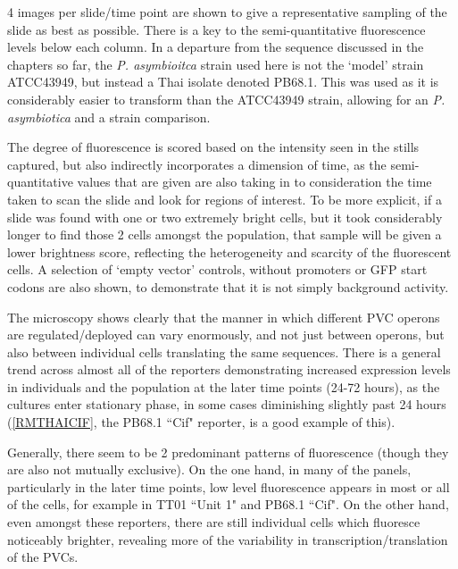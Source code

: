 4 images per slide/time point are shown to give a representative sampling of the slide as best as possible. There is a key to the semi-quantitative fluorescence levels below each column. In a departure from the sequence discussed in the chapters so far, the \emph{P. asymbioitca} strain used here is not the `model' strain ATCC43949, but instead a Thai isolate denoted PB68.1. This was used as it is considerably easier to transform than the ATCC43949 strain, allowing for an \emph{P. asymbiotica} and a \Plum{} strain comparison.

The degree of fluorescence is scored based on the intensity seen in the stills captured, but also indirectly incorporates a dimension of time, as the semi-quantitative values that are given are also taking in to consideration the time taken to scan the slide and look for regions of interest. To be more explicit, if a slide was found with one or two extremely bright cells, but it took considerably longer to find those 2 cells amongst the population, that sample will be given a lower brightness score, reflecting the heterogeneity and scarcity of the fluorescent cells. A selection of `empty vector' controls, without promoters or GFP start codons are also shown, to demonstrate that it is not simply background activity.


\clearpage

The microscopy shows clearly that the manner in which different PVC operons are regulated/deployed can vary enormously, and not just between operons, but also between individual cells translating the same sequences. There is a general trend across almost all of the reporters demonstrating increased expression levels in individuals and the population at the later time points (24-72 hours), as the cultures enter stationary phase, in some cases diminishing slightly past 24 hours (\vref{RMTHAICIF}, the PB68.1 ``Cif" reporter, is a good example of this).

Generally, there seem to be 2 predominant patterns of fluorescence (though they are also not mutually exclusive). On the one hand, in many of the panels, particularly in the later time points, low level fluorescence appears in most or all of the cells, for example in \Plum{} TT01 ``Unit 1" and \Pasy{} PB68.1 ``Cif". On the other hand, even amongst these reporters, there are still individual cells which fluoresce noticeably brighter, revealing more of the variability in transcription/translation of the PVCs.

